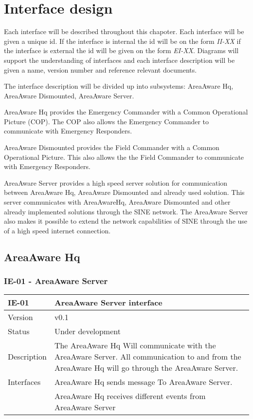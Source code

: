 \label{chp_interfaceDesign}
\chapter{Interface design}
Each interface will be described throughout this chapoter. Each interface will be given a unique id. If the interface is internal the id will be on the form \emph{II-XX} if the interface is external the id will be given on the form \emph{EI-XX}. Diagrams will support the understanding of interfaces and each interface description will be given a name, version number and reference relevant documents.

The interface description will be divided up into subsystems: AreaAware Hq, AreaAware Dismounted, AreaAware Server.

AreaAware Hq provides the Emergency Commander with a Common Operational Picture (COP). The COP also allows the Emergency Commander to communicate with Emergency Responders.

AreaAware Dismounted provides the Field Commander with a Common Operational Picture. This also allows the the Field Commander to communicate with Emergency Responders. 

AreaAware Server provides a high speed server solution for communication between AreaAware Hq, AreaAware Dismounted and already used solution. This server communicates with AreaAwareHq, AreaAware Dismounted and other already implemented solutions through the SINE network. The AreaAware Server also makes it possible to extend the network capabilities of SINE through the use of a high speed internet connection.


\section{AreaAware Hq}

\subsection{IE-01 - AreaAware Server}

\begin{longtable}{| p{3.5cm} |  p{10cm} | }
	\hline
	\textbf{IE-01} &  \textbf{AreaAware Server interface } \\
	\hline
	Version & v0.1 \\
	\hline
	Status & Under development \\
	\hline
	 Description & The AreaAware Hq Will communicate with the AreaAware Server. All communication to and from the AreaAware Hq will go through the AreaAware Server. 
	  \\
	\hline
	 Interfaces & AreaAware Hq sends message To AreaAware Server.  \\
					   & AreaAware Hq receives different events from AreaAware Server  \\
	\hline
\end{longtable}


